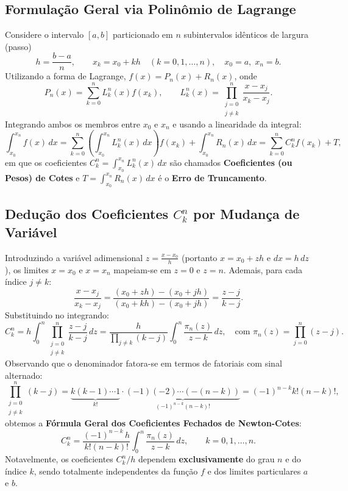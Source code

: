 \documentclass[11pt,a4paper]{article}
\begin{document}
\subsection{Formulação Geral via Polinômio de Lagrange}
Considere o intervalo $[a, b]$ particionado em $n$ subintervalos idênticos de largura (passo)
\begin{equation}
    h = \frac{b - a}{n}, \qquad x_k = x_0 + k h \quad (k = 0, 1, \dots, n), \quad x_0 = a,\; x_n = b.
\end{equation}
Utilizando a forma de Lagrange, $f(x) = P_n(x) + R_n(x)$, onde
\begin{equation}
    P_n(x) = \sum_{k=0}^{n} L_k^n(x) f(x_k), \qquad L_k^n(x) = \prod_{\substack{j=0 \\ j \neq k}}^{n} \frac{x - x_j}{x_k - x_j}.
\end{equation}
Integrando ambos os membros entre $x_0$ e $x_n$ e usando a linearidade da integral:
\begin{equation}
    \int_{x_0}^{x_n} f(x)\,dx = \sum_{k=0}^{n} \left( \int_{x_0}^{x_n} L_k^n(x)\,dx \right) f(x_k) + \int_{x_0}^{x_n} R_n(x)\,dx = \sum_{k=0}^{n} C_k^n f(x_k) + T,
\end{equation}
em que os coeficientes $C_k^n = \int_{x_0}^{x_n} L_k^n(x)\,dx$ são chamados \textbf{Coeficientes (ou Pesos) de Cotes} e $T = \int_{x_0}^{x_n} R_n(x)\,dx$ é o \textbf{Erro de Truncamento}.

\subsection{Dedução dos Coeficientes $C_k^n$ por Mudança de Variável}
Introduzindo a variável adimensional $z = \frac{x - x_0}{h}$ (portanto $x = x_0 + z h$ e $dx = h\,dz$), os limites $x = x_0$ e $x = x_n$ mapeiam-se em $z = 0$ e $z = n$. Ademais, para cada índice $j \neq k$:
\[
\frac{x - x_j}{x_k - x_j} = \frac{(x_0 + z h) - (x_0 + j h)}{(x_0 + k h) - (x_0 + j h)} = \frac{z - j}{k - j}.
\]
Substituindo no integrando:
\[
C_k^n = h \int_0^n \prod_{\substack{j=0 \\ j \neq k}}^{n} \frac{z - j}{k - j}\,dz = \frac{h}{\prod_{j \neq k} (k - j)} \int_0^n \frac{\pi_n(z)}{z - k}\,dz, \quad \text{com } \pi_n(z) = \prod_{j=0}^{n} (z - j).
\]
Observando que o denominador fatora-se em termos de fatoriais com sinal alternado:
\[
\prod_{\substack{j=0 \\ j \neq k}}^{n} (k - j) = \underbrace{k(k-1)\cdots 1}_{k!} \cdot \underbrace{(-1)(-2)\cdots (-(n-k))}_{(-1)^{n-k}(n-k)!} = (-1)^{n-k} k!(n - k)!,
\]
obtemos a \textbf{Fórmula Geral dos Coeficientes Fechados de Newton-Cotes}:
\begin{equation}
    C_k^n = \frac{(-1)^{n-k}\,h}{k!(n - k)!} \int_0^n \frac{\pi_n(z)}{z - k}\,dz, \qquad k = 0, 1, \dots, n.
\end{equation}
Notavelmente, os coeficientes $C_k^n / h$ dependem \textbf{exclusivamente} do grau $n$ e do índice $k$, sendo totalmente independentes da função $f$ e dos limites particulares $a$ e $b$.
\end{document}
